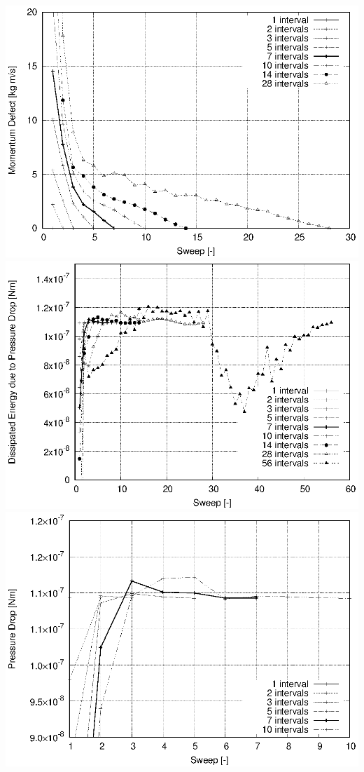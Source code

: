 \documentclass[twoside,a4paper,12pt,bibliography=totoc, parskip=half,english]{scrreprt}
\begin{document}
\includegraphics[scale=1]{13_primal_modef_newton.eps}
\includegraphics[scale=1]{12_primal_modef_newton.eps}
\includegraphics[scale=1]{12_primal_modef_newton_zoom.eps}
\end{document}
